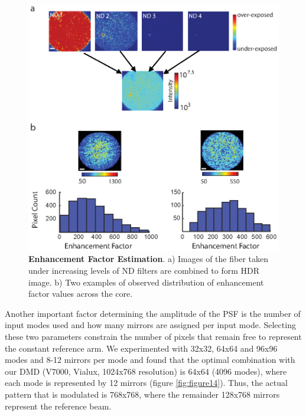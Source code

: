 \documentclass[10pt]{article}
\begin{document}
\begin{figure}
\centering\includegraphics[width=13cm]{figure4}
\caption{\textbf{Enhancement Factor Estimation}. a) Images of the fiber taken under increasing levels of ND filters are combined to form HDR image. b) Two examples of observed distribution of enhancement factor values across the core.}
\label{fig:figure4}
\end{figure}

Another important factor determining the amplitude of the PSF is the number of input modes used and how many mirrors are assigned per input mode. Selecting these two parameters constrain the number of pixels that remain free to represent the constant reference arm. We experimented with 32x32, 64x64 and 96x96 modes and 8-12 mirrors per mode and found that the optimal combination with our DMD (V7000, Vialux, 1024x768 resolution) is 64x64 (4096 modes), where each mode is represented by 12 mirrors (figure \ref{fig:figure14}). Thus, the actual pattern that is modulated is 768x768, where the remainder 128x768 mirrors represent the reference beam.
\end{document}
